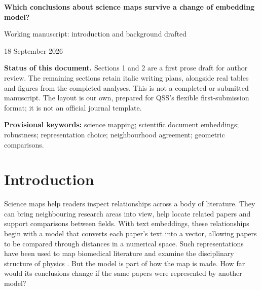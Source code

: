 \documentclass[12pt]{article}
\begin{document}
\begin{center}
{\LARGE\bfseries Which conclusions about science maps survive a change of embedding model?\par}
\vspace{12pt}
{\large Working manuscript: introduction and background drafted\par}
\vspace{5pt}
{18 September 2026\par}
\end{center}
\vspace{5pt}
\medskip
\textbf{Status of this document.} Sections 1 and 2 are a first prose draft for author review. The remaining sections retain italic writing plans, alongside real tables and figures from the completed analyses. This is not a completed or submitted manuscript. The layout is our own, prepared for QSS's flexible first-submission format; it is not an official journal template.

\begin{abstract}
\end{abstract}
\textbf{Provisional keywords:} science mapping; scientific document embeddings; robustness; representation choice; neighbourhood agreement; geometric comparisons.

\clearpage
{\small{}\tableofcontents}
\clearpage

\section{Introduction}
Science maps help readers inspect relationships across a body of literature. They can bring neighbouring research areas into view, help locate related papers and support comparisons between fields. With text embeddings, these relationships begin with a model that converts each paper's text into a vector, allowing papers to be compared through distances in a numerical space. Such representations have been used to map biomedical literature and examine the disciplinary structure of physics \citep{refbe130e2973,refc0e2cc29e0}. But the model is part of how the map is made. How far would its conclusions change if the same papers were represented by another model?
\end{document}
